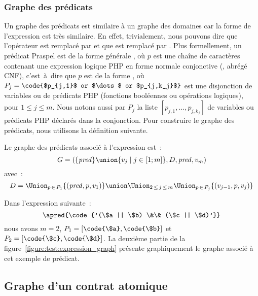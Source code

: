 \subsubsection{Graphe des prédicats}

Un graphe des prédicats est similaire à un graphe des domaines car la forme de
l'expression est très similaire. En effet, trivialement, nous pouvons dire que
l'opérateur  est remplacé par \code{\&\&} et que  est
remplacé par \code{||}. Plus formellement, un prédicat Praspel est de la forme
générale , où $p$ est une chaîne de caractères contenant une expression
logique PHP en forme normale conjonctive (,
abrégé CNF), c'est~à~dire que $p$ est de la forme , où $P_j = \code{$p_{j,1}$ or $\dots$ or $p_{j,k_j}$}$ est une
disjonction de variables ou de prédicats PHP (fonctions booléennes ou opérations
logiques), pour $1 \leq j \leq m$. Nous notons aussi par $P_j$ la liste
$[p_{j,1}, \dots, p_{j,k_j}]$ de variables ou prédicats PHP déclarés dans la
conjonction.  Pour construire le graphe des prédicats, nous utilisons la
définition suivante.

\begin{definition}

Le {\strong graphe des prédicats} associé à l'expression  est~:
%
$$G = (\{\mathit{pred}\} \union \{v_j \;\vert\; j \in [1; m]\}, D, \mathit{pred}, v_m)$$
%
avec~:
%
$$D = \Union_{p \,\in\, P_1} \{(\mathit{pred}, p, v_1)\} \union
      \Union_{2 \,\leq\, j \,\leq\, m}
      \Union_{p \,\in\, P_j} \{(v_{j - 1}, p, v_j)\}$$

\end{definition}

\begin{example}
\label{example:test:expression_graph2}

Dans l'expression suivante~:
%
$$\apred{\code{'(\$a || \$b) \&\& (\$c || \$d)'}}$$
%
nous avons $m = 2$, $P_1 = [\code{\$a}, \code{\$b}]$ et $P_2 = [\code{\$c},
\code{\$d}]$. La deuxième partie de la
figure~\ref{figure:test:expression_graph} présente graphiquement le graphe
associé à cet exemple de prédicat.

\end{example}

\subsection{Graphe d'un contrat atomique}
\label{subsection:test:atomic_graph}

